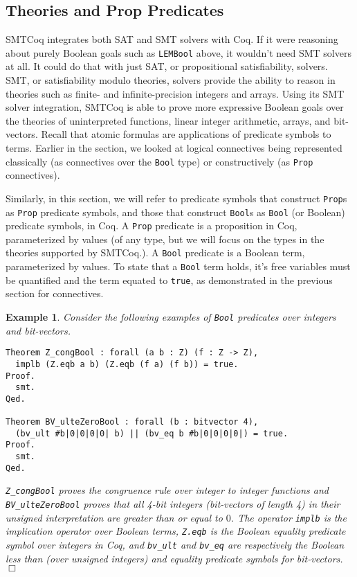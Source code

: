 \documentclass[11pt]{article}
\newtheorem{example}{Example}[section]
\begin{document}
	\subsection{Theories and Prop Predicates}
	SMTCoq integrates both 
	SAT and SMT solvers with Coq. If 
	it were reasoning about purely 
	Boolean goals such as 
	\texttt{LEMBool} above, it wouldn't 
	need SMT solvers at all. It could
	do that with just SAT, or
	propositional satisfiability,
	solvers. SMT, or satisfiability
	modulo theories, solvers provide 
	the ability to reason in theories
	such as finite- and infinite-precision 
	integers and arrays. Using its SMT 
	solver integration, SMTCoq is able to 
	prove more expressive Boolean goals
	over the theories of uninterpreted 
	functions, linear integer arithmetic,
	arrays, and bit-vectors. Recall that
	atomic formulas are applications of  
	predicate symbols to
	terms. Earlier in the section, 
	we looked at logical connectives 
	being represented classically (as 
	connectives over the \texttt{Bool}
	type) or constructively (as 
	\texttt{Prop} connectives). 
	
	Similarly, in this section, we will 
	refer to predicate symbols that 
	construct \texttt{Prop}s as
	\texttt{Prop} predicate symbols, and 
	those that construct \texttt{Bool}s 
	as \texttt{Bool} (or Boolean) predicate
	symbols, in Coq. A \texttt{Prop} predicate
	is a proposition in Coq, 
	parameterized
	by values (of any type, but we will 
	focus on the types in the theories 
	supported by SMTCoq.). A \texttt{Bool}
	predicate is a Boolean term,
	parameterized by values. To
	state that a \texttt{Bool} term
	holds, it's free variables must be 
	quantified and the term equated to 
	\texttt{true}, as demonstrated 
	in the previous section for connectives.
	
	\begin{example}
		\label{ex:boolpred}
		\em Consider the following examples
		of \texttt{Bool} predicates 
		over integers and bit-vectors.
		\begin{verbatim}
Theorem Z_congBool : forall (a b : Z) (f : Z -> Z), 
  implb (Z.eqb a b) (Z.eqb (f a) (f b)) = true.
Proof.
  smt.
Qed.

Theorem BV_ulteZeroBool : forall (b : bitvector 4),
  (bv_ult #b|0|0|0|0| b) || (bv_eq b #b|0|0|0|0|) = true.
Proof.
  smt.
Qed.

		\end{verbatim}
		\texttt{Z\_congBool} proves the 
		congruence rule over integer 
		to integer functions and 
		\texttt{BV\_ulteZeroBool} proves 
		that all 4-bit integers (bit-vectors 
		of length 4) in their 
		unsigned interpretation are 
		greater than or equal to $0$. The
		operator
		\texttt{implb} is the implication 
		operator over Boolean terms, 
		\texttt{Z.eqb} is the Boolean 
		equality predicate symbol over 
		integers in Coq, and 
		\texttt{bv\_ult}
		and \texttt{bv\_eq} are 
		respectively the Boolean 
		less than (over unsigned integers)
		and equality predicate symbols for 
		bit-vectors. \hfill$\Box$
	\end{example}
\end{document}
